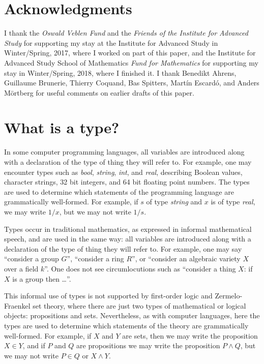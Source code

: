 \documentclass[letter,12pt]{amsart}
\theoremstyle{definition}
\theoremstyle{remark}
\numberwithin{equation}{section}
\begin{document}
\section*{Acknowledgments}

I thank the {\em Oswald Veblen Fund} and the {\em Friends of the Institute for Advanced Study} for supporting my stay at the Institute for
Advanced Study in Winter/Spring, 2017, where I worked on part of this paper, and the Institute for Advanced Study School of Mathematics {\em
  Fund for Mathematics} for supporting my stay in Winter/Spring, 2018, where I finished it.  I thank Benedikt Ahrens, Guillaume Brunerie, 
Thierry Coquand, Bas Spitters,  Mart\'in Escard\'o, and Anders M\"ortberg for useful comments on earlier drafts of this paper.

\newpage

\section{What is a type?}

In some computer programming languages, all variables are introduced along with a declaration of the type of thing they will refer to.  For example,
one may encounter types such as {\it bool}, {\it string}, {\it int}, and {\it real},
describing Boolean values, character strings, 32 bit integers, and 64 bit
floating point numbers.  The types are used to determine which statements of the programming language are grammatically well-formed.
For example, if $s$ of type {\it string} and $x$ is of type {\it real}, we may write $1/x$, but we may not write $1/s$.

Types occur in traditional mathematics, as expressed in informal mathematical speech, and are used in the same way: all variables are introduced
along with a declaration of the type of thing they will refer to.  For example, one may say ``consider a group $G$'', ``consider a ring $R$'',
or ``consider an algebraic variety $X$ over a field $k$''.  One does not see circumlocutions such as ``consider a thing $X$: if $X$ is a group
then \dots''.

This informal use of types is not supported by first-order logic and Zermelo-Fraenkel set theory, where there are just two types of mathematical
or logical objects: propositions and sets.  Nevertheless, as with computer languages, here the types are used to determine which statements of
the theory are grammatically well-formed.  For example, if $X$ and $Y$ are sets, then we may write the proposition $X \in Y$, and if $P$ and $Q$
are propositions we may write the proposition $P \wedge Q$, but we may not write $P \in Q$ or $X \wedge Y$.
\end{document}
